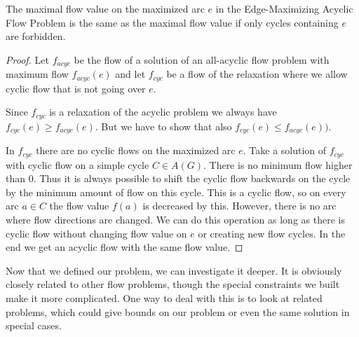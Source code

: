 \begin{prop}
  The maximal flow value on the maximized arc $e$ in the Edge-Maximizing Acyclic Flow Problem is the same as the 
  maximal flow value if only cycles containing $e$ are forbidden. 
\end{prop}
\begin{proof}
 Let $f_{acyc}$ be the flow of a solution of an all-acyclic flow problem with maximum flow $f_{acyc}(e)$ and let 
$f_{cyc}$ be a flow of the relaxation where we allow cyclic flow that is not going over $e$. 

Since $f_{cyc}$ is a relaxation of the acyclic problem we always have $f_{cyc}(e)\ge f_{acyc}(e)$. But we have to show 
that also $f_{cyc}(e)\le f_{acyc}(e))$.

In $f_{cyc}$ there are no cyclic flows on the maximized arc $e$. Take a solution of $f_{cyc}$ with cyclic flow on a 
simple cycle $C\in A(G)$. There is no minimum flow higher than 0. Thus it is always possible to shift the cyclic flow 
backwards on the cycle by the minimum amount of flow on this cycle. This is a cyclic flow, so on every arc $a\in C$ the 
flow value $f(a)$ is decreased by this. However, there is no arc where flow directions are changed. We can do this 
operation as long as there is cyclic flow without changing flow value on $e$ or creating new flow cycles. In the 
end we get an acyclic flow with the same flow value.
\end{proof}


Now that we defined our problem, we can investigate it deeper. It is obviously closely related to other flow problems, 
though the special constraints we built make it more complicated. One way to deal with this is to look at related 
problems, which could give bounds on our problem or even the same solution in special cases.

